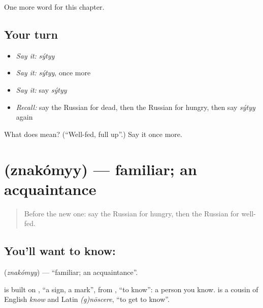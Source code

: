 \begin{grammarlens}[title={What you've built}]
One more word for this chapter.
\end{grammarlens}

\subsection*{Your turn}
\begin{itemize}
\raggedright
  \item \emph{Say it:} \emph{sýtyy}
  \item \emph{Say it:} \emph{sýtyy}, once more
  \item \emph{Say it:} say \emph{sýtyy}
  \item \emph{Recall:} say the Russian for dead, then the Russian for hungry, then say \emph{sýtyy} again
\end{itemize}

\begin{tcolorbox}[breakable,colback=teal!4,colframe=teal!35!black,title={Before you move on}]
What does  mean? (\textquotedblleft{}Well-fed, full up\textquotedblright{}.) Say it once more.
\end{tcolorbox}
\section[\texorpdfstring{\ru{знакомый} (znakómyy)}{знакомый (znakómyy)}]{ (znakómyy) — familiar; an acquaintance}

\label{lesson:RU-C158-znakomyy}



\begin{quote}
Before the new one: say the Russian for hungry, then the Russian for well-fed.
\end{quote}

\subsection*{You'll want to know: }
\textbf{} (\emph{znakómyy}) — \textquotedblleft{}familiar; an acquaintance\textquotedblright{}.

\begin{cousinweb}
\textbf{} is built on \emph{}, \textquotedblleft{}a sign, a mark\textquotedblright{}, from \emph{}, \textquotedblleft{}to know\textquotedblright{}: a person you know. \emph{} is a cousin of English \emph{know} and Latin \emph{(g)nōscere}, \textquotedblleft{}to get to know\textquotedblright{}.
\end{cousinweb}

